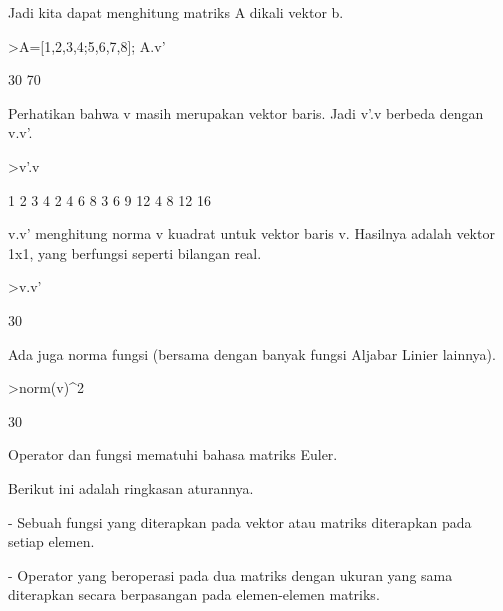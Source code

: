 \documentclass[a4paper,10pt]{article}
\begin{document}
\begin{eulernotebook}
\begin{eulercomment}
\begin{eulercomment}
\begin{eulercomment}
\begin{eulercomment}
\begin{eulercomment}
\begin{eulercomment}
\begin{euleroutput}
\end{euleroutput}
\begin{eulercomment}
Jadi kita dapat menghitung matriks A dikali vektor b.
\end{eulercomment}
\begin{eulerprompt}
>A=[1,2,3,4;5,6,7,8]; A.v'
\end{eulerprompt}
\begin{euleroutput}
             30 
             70 
\end{euleroutput}
\begin{eulercomment}
Perhatikan bahwa v masih merupakan vektor baris. Jadi v'.v berbeda
dengan v.v'.
\end{eulercomment}
\begin{eulerprompt}
>v'.v
\end{eulerprompt}
\begin{euleroutput}
              1             2             3             4 
              2             4             6             8 
              3             6             9            12 
              4             8            12            16 
\end{euleroutput}
\begin{eulercomment}
v.v' menghitung norma v kuadrat untuk vektor baris v. Hasilnya adalah
vektor 1x1, yang berfungsi seperti bilangan real.
\end{eulercomment}
\begin{eulerprompt}
>v.v'
\end{eulerprompt}
\begin{euleroutput}
  30
\end{euleroutput}
\begin{eulercomment}
Ada juga norma fungsi (bersama dengan banyak fungsi Aljabar Linier
lainnya).
\end{eulercomment}
\begin{eulerprompt}
>norm(v)^2
\end{eulerprompt}
\begin{euleroutput}
  30
\end{euleroutput}
\begin{eulercomment}
Operator dan fungsi mematuhi bahasa matriks Euler.

Berikut ini adalah ringkasan aturannya.

- Sebuah fungsi yang diterapkan pada vektor atau matriks diterapkan
pada setiap elemen.

- Operator yang beroperasi pada dua matriks dengan ukuran yang sama
diterapkan secara berpasangan pada elemen-elemen matriks.


\end{eulercomment}
\end{eulercomment}
\end{eulercomment}
\end{eulercomment}
\end{eulercomment}
\end{eulercomment}
\end{eulercomment}
\end{eulernotebook}
\end{document}
